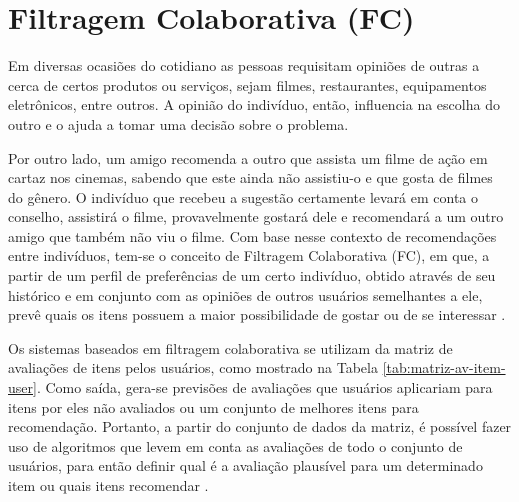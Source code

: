 \section{Filtragem Colaborativa (FC)} \label{sec:filtragem-colaborativa}
    
    Em diversas ocasiões do cotidiano as pessoas requisitam opiniões de outras a cerca de certos produtos ou serviços, sejam filmes, restaurantes, equipamentos eletrônicos, entre outros. A opinião do indivíduo, então, influencia na escolha do outro e o ajuda a tomar uma decisão sobre o problema. 
    
    Por outro lado, um amigo recomenda a outro que assista um filme de ação em cartaz nos cinemas, sabendo que este ainda não assistiu-o e que gosta de filmes do gênero. O indivíduo que recebeu a sugestão certamente levará em conta o conselho, assistirá o filme, provavelmente gostará dele e recomendará a um outro amigo que também não viu o filme.    
    Com base nesse contexto de recomendações entre indivíduos, tem-se o conceito de Filtragem Colaborativa (FC), em que, a partir de um perfil de preferências de um certo indivíduo, obtido através de seu histórico e em conjunto com as opiniões de outros usuários semelhantes a ele, prevê quais os itens possuem a maior possibilidade de gostar ou de se interessar \cite{Jannach2010}.



    
    Os sistemas baseados em filtragem colaborativa se utilizam da matriz de avaliações de itens pelos usuários, como mostrado na Tabela \ref{tab:matriz-av-item-user}. Como saída, gera-se previsões de avaliações que usuários aplicariam para itens por eles não avaliados ou um conjunto de melhores itens para recomendação. Portanto, a partir do conjunto de dados da matriz, é possível fazer uso de algoritmos que levem em conta as avaliações de todo o conjunto de usuários, para então definir qual é a avaliação plausível para um determinado item ou quais itens recomendar \cite{Bobadilla_2013}.
    
